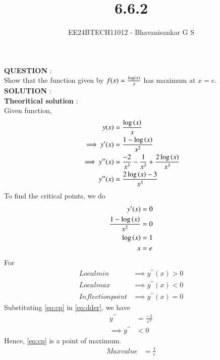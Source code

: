\documentclass[journal]{IEEEtran}
\begin{document}

\vspace{3cm}

\title{6.6.2}
\author{EE24BTECH11012 - Bhavanisankar G S}
{\let\newpage\relax\maketitle}

\renewcommand{\thefigure}{\theenumi}
\renewcommand{\thetable}{\theenumi}
\setlength{\intextsep}{10pt} %


\renewcommand{\thetable}{\theenumi}

\textbf{QUESTION} : \\
Show that the function given by $f(x) = \frac{log \left(x\right)}{x}$ has maximum at $x = e$. \\
\textbf{SOLUTION} : \\

\textbf{Theoritical solution} : \\
Given function, 
\begin{align}
	y(x) &= \frac{\log\left(x\right)}{x} \label{eq:fn} \\
	\implies y^{\prime} (x) &= \frac{1 - \log \left(x\right)}{x^2}  \label{eq:der} \\
	\implies y^{\prime \prime} (x) &= \frac{-2}{x^3} - \frac{1}{x^3} + \frac{2 \log \left(x\right)}{x^3}  \\
	y^{\prime \prime} (x) &= \frac{2 \log \left(x\right) - 3}{x^3} \label{eq:dder}
\end{align}
To find the critical points, we do
\begin{align}
	y^{\prime} (x) &= 0 \\
	 \frac{1 - \log \left(x\right)}{x^2} &= 0 \\
	\log \left(x\right) &= 1 \\
	x &= e \label{eq:cp}
\end{align}
For 
\begin{align}
	Local min &\implies y^{\prime \prime} (x) > 0 \\
	Local max &\implies y^{\prime \prime} (x) < 0 \\
	Inflection point &\implies y^{\prime \prime} (x) = 0
\end{align}
Substituting \eqref{eq:cp} in \eqref{eq:dder}, we have
\begin{align}
	y^{\prime \prime} &= \frac{-1}{e^3} \\
	\implies y^{\prime \prime} &< 0
\end{align}
Hence, \eqref{eq:cp} is a point of maximum. \\
\begin{align}
	Max value &= \frac{1}{e}
\end{align}
\end{document}
